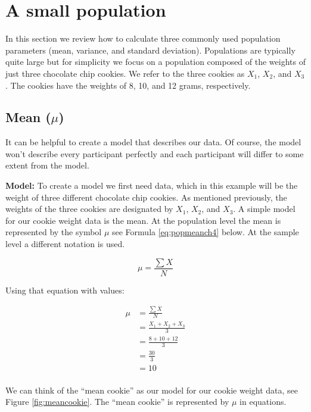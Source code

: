 \documentclass[
]{krantz}
\begin{document}
\hypertarget{a-small-population}{%
\section{A small population}\label{a-small-population}}

In this section we review how to calculate three commonly used population parameters (mean, variance, and standard deviation). Populations are typically quite large but for simplicity we focus on a population composed of the weights of just three chocolate chip cookies. We refer to the three cookies as \(X_1\), \(X_2\), and \(X_3\). The cookies have the weights of 8, 10, and 12 grams, respectively.

\hypertarget{mean-mu}{%
\subsection{\texorpdfstring{Mean (\(\mu\))}{Mean (\textbackslash mu)}}\label{mean-mu}}

It can be helpful to create a model that describes our data. Of course, the model won't describe every participant perfectly and each participant will differ to some extent from the model.

\textbf{Model:} To create a model we first need data, which in this example will be the weight of three different chocolate chip cookies. As mentioned previously, the weights of the three cookies are designated by \(X_1\), \(X_2\), and \(X_3\). A simple model for our cookie weight data is the mean. At the population level the mean is represented by the symbol \(\mu\) see Formula \eqref{eq:popmeanch4} below. At the sample level a different notation is used.

\begin{equation} 
\mu = \frac{\sum{X}}{N}
      \label{eq:popmeanch4}
\end{equation}

Using that equation with values:

\[
\begin{aligned} 
\mu &= \frac{\sum{X}}{N} \\
&= \frac{X_1 + X_2 + X_3}{3}\\ 
&= \frac{8 + 10 + 12}{3}\\
&= \frac{30}{3}\\
&= 10\\
\end{aligned} 
\]

We can think of the ``mean cookie'' as our model for our cookie weight data, see Figure \ref{fig:meancookie}. The ``mean cookie'' is represented by \(\mu\) in equations.
\end{document}
